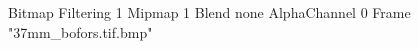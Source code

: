 {Bitmap
	{Filtering 1}
	{Mipmap 1}
	{Blend none}
	{AlphaChannel 0}
	{Frame "37mm_bofors.tif.bmp"}
}
